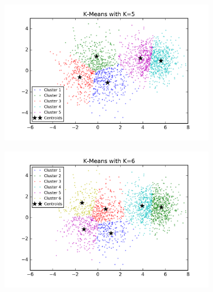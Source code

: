 \begin{description}
\begin{figure}[htb]
\begin{subfigure}[b]{0.475\textwidth}
        \end{subfigure}
        \begin{subfigure}[b]{0.475\textwidth}  
            \centering 
            \includegraphics[width=\textwidth]{./figures/clustering_kMeans_5.png}
        \end{subfigure}
        \hfill
        \begin{subfigure}[b]{0.475\textwidth}   
            \centering 
            \includegraphics[width=\textwidth]{./figures/clustering_kMeans_6.png}
        \end{subfigure}
        \begin{subfigure}[b]{0.475\textwidth}   
            \centering 

\end{subfigure}
\end{figure}
\end{description}
